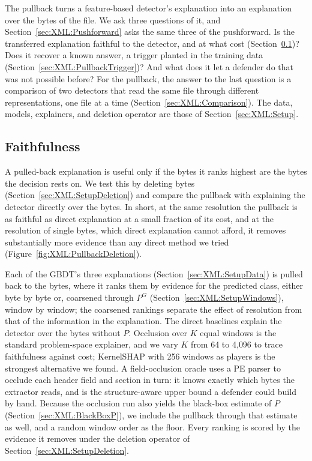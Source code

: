 The pullback turns a feature-based detector's explanation into an explanation over the bytes of the file. We ask
three questions of it, and Section~\ref{sec:XML:Pushforward} asks the same three of the pushforward. Is the transferred
explanation faithful to the detector, and at what cost (Section~\ref{sec:XML:PullbackFaithfulness})? Does it recover a
known answer, a trigger planted in the training data (Section~\ref{sec:XML:PullbackTrigger})? And what does it let a
defender do that was not possible before? For the pullback, the answer to the last question is a comparison of two
detectors that read the same file through different representations, one file at a time
(Section~\ref{sec:XML:Comparison}). The data, models, explainers, and deletion operator are those of
Section~\ref{sec:XML:Setup}.

\subsection{Faithfulness}
\label{sec:XML:PullbackFaithfulness}

A pulled-back explanation is useful only if the bytes it ranks highest are the bytes the decision rests on. We test this
by deleting bytes (Section~\ref{sec:XML:SetupDeletion}) and compare the pullback with explaining the detector directly
over the bytes. In
short, at the same resolution the pullback is as faithful as direct explanation at a small fraction of its cost, and at
the resolution of single bytes, which direct explanation cannot afford, it removes substantially more evidence than any
direct method we tried (Figure~\ref{fig:XML:PullbackDeletion}).

Each of the GBDT's three explanations (Section~\ref{sec:XML:SetupData}) is pulled back to the bytes, where it ranks them by evidence for the predicted class, either byte by byte or, coarsened
through $P^G$ (Section~\ref{sec:XML:SetupWindows}), window by window; the coarsened rankings separate the effect of
resolution from that of the information in the explanation. The direct baselines explain the detector over the bytes
without $P$. Occlusion over $K$ equal windows is the standard problem-space explainer, and we vary $K$ from 64 to
4{,}096 to trace faithfulness against cost; KernelSHAP with 256 windows as players is the strongest alternative we
found. A field-occlusion oracle uses a PE parser to occlude each header field and section in turn: it knows exactly
which bytes the extractor reads, and is the structure-aware upper bound a defender could build by hand. Because the
occlusion run also yields the black-box estimate of $P$ (Section~\ref{sec:XML:BlackBoxP}), we include the pullback
through that estimate as well, and a random window order as the floor. Every ranking is scored by the evidence it
removes under the deletion operator of Section~\ref{sec:XML:SetupDeletion}.

